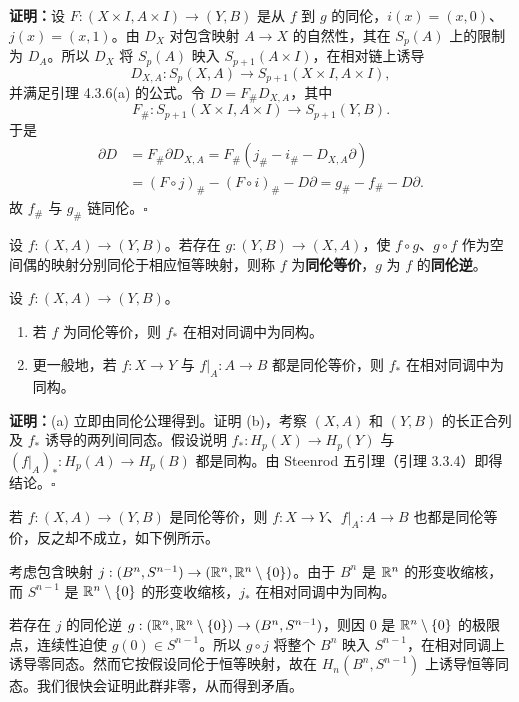 \textbf{证明：}设 $F:(X\times I,A\times I)\to(Y,B)$ 是从 $f$ 到 $g$ 的同伦，$i(x)=(x,0)$、$j(x)=(x,1)$。由 $D_X$ 对包含映射 $A\to X$ 的自然性，其在 $S_p(A)$ 上的限制为 $D_A$。所以 $D_X$ 将 $S_p(A)$ 映入 $S_{p+1}(A\times I)$，在相对链上诱导
\[
D_{X,A}:S_p(X,A)\to S_{p+1}(X\times I,A\times I),
\]
并满足引理 4.3.6(a) 的公式。令 $D=F_\#D_{X,A}$，其中
\[
F_\#:S_{p+1}(X\times I,A\times I)\to S_{p+1}(Y,B).
\]
于是
\begin{align*}
\partial D&=F_\#\partial D_{X,A}=F_\#(j_\#-i_\#-D_{X,A}\partial)\\
&=(F\circ j)_\#-(F\circ i)_\#-D\partial=g_\#-f_\#-D\partial.
\end{align*}
故 $f_\#$ 与 $g_\#$ 链同伦。\hfill$\square$

设 $f:(X,A)\to(Y,B)$。若存在 $g:(Y,B)\to(X,A)$，使 $f\circ g$、$g\circ f$ 作为空间偶的映射分别同伦于相应恒等映射，则称 $f$ 为\textbf{同伦等价}，$g$ 为 $f$ 的\textbf{同伦逆}。

设 $f:(X,A)\to(Y,B)$。
\begin{enumerate}[label=(\alph*)]
\item 若 $f$ 为同伦等价，则 $f_*$ 在相对同调中为同构。
\item 更一般地，若 $f:X\to Y$ 与 $f|_A:A\to B$ 都是同伦等价，则 $f_*$ 在相对同调中为同构。
\end{enumerate}
\textbf{证明：}(a) 立即由同伦公理得到。证明 (b)，考察 $(X,A)$ 和 $(Y,B)$ 的长正合列及 $f_*$ 诱导的两列间同态。假设说明 $f_*:H_p(X)\to H_p(Y)$ 与 $(f|_A)_*:H_p(A)\to H_p(B)$ 都是同构。由 Steenrod 五引理（引理 3.3.4）即得结论。\hfill$\square$

若 $f:(X,A)\to(Y,B)$ 是同伦等价，则 $f:X\to Y$、$f|_A:A\to B$ 也都是同伦等价，反之却不成立，如下例所示。

考虑包含映射 $j:(B^n,S^{n-1})\to(\mathbb{R}^n,\mathbb{R}^n\setminus\{0\})$。由于 $B^n$ 是 $\mathbb{R}^n$ 的形变收缩核，而 $S^{n-1}$ 是 $\mathbb{R}^n\setminus\{0\}$ 的形变收缩核，$j_*$ 在相对同调中为同构。

若存在 $j$ 的同伦逆 $g:(\mathbb{R}^n,\mathbb{R}^n\setminus\{0\})\to(B^n,S^{n-1})$，则因 $0$ 是 $\mathbb{R}^n\setminus\{0\}$ 的极限点，连续性迫使 $g(0)\in S^{n-1}$。所以 $g\circ j$ 将整个 $B^n$ 映入 $S^{n-1}$，在相对同调上诱导零同态。然而它按假设同伦于恒等映射，故在 $H_n(B^n,S^{n-1})$ 上诱导恒等同态。我们很快会证明此群非零，从而得到矛盾。

